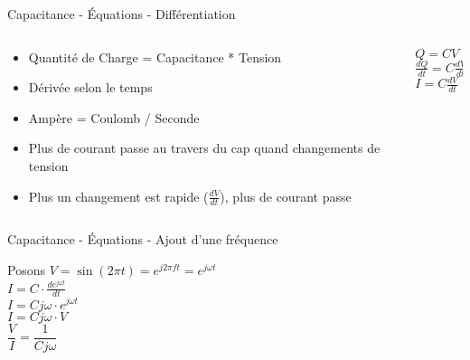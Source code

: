 \begin{frame}{Capacitance - Équations - Différentiation}
    \begin{columns}
        \begin{column}{0.5\textwidth}
            \begin{itemize}
                \item Quantité de Charge = Capacitance * Tension
                \item Dérivée selon le temps
                \item Ampère = Coulomb / Seconde
                \bigskip
                \item Plus de courant passe au travers du cap quand changements de tension
                \item Plus un changement est rapide ($\frac{dV}{dt}$), plus de courant passe
            \end{itemize}
        \end{column}
        \begin{column}{0.5\textwidth}
            \Large{
            \begin{center}
                $Q = CV$\\
                \vspace{10pt}
                $\frac{dQ}{dt} = C \frac{dV}{dt}$\\
                \vspace{10pt}
                $I = C \frac{dV}{dt}$\\
            \end{center}
            }
        \end{column}
    \end{columns}
\end{frame}

\begin{frame}{Capacitance - Équations - Ajout d'une fréquence}
    \begin{center}
        \Large{
            Posons $V = \sin(2 \pi t) = e^{j 2 \pi f t} = e^{j \omega t}$\\
            \vspace{15pt}
            $I = C \cdot \frac{de^{j \omega t}}{dt}$\\
            \vspace{5pt}
            $I = C j \omega \cdot e^{j \omega t}$\\
            \vspace{5pt}
            $I = C j \omega \cdot V$\\
            \vspace{20pt}
            $\dfrac{V}{I} = \dfrac{1}{C j \omega}$\\
        }
    \end{center}
\end{frame}

